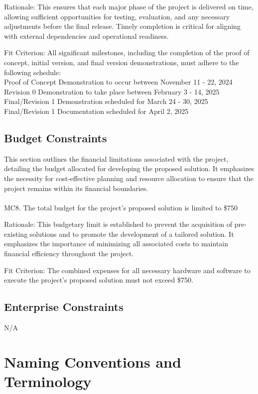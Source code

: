 \documentclass[12pt]{article}
\begin{document}
Rationale: This ensures that each major phase of the project is delivered on time, allowing 
sufficient opportunities for testing, evaluation, and any necessary adjustments before the final 
release. Timely completion is critical for aligning with external dependencies and operational 
readiness.

Fit Criterion: All significant milestones, including the completion of the proof of concept, 
initial version, and final version demonstrations, must adhere to the following schedule:\\
Proof of Concept Demonstration to occur between November 11 - 22, 2024\\
Revision 0 Demonstration to take place between February 3 - 14, 2025\\
Final/Revision 1 Demonstration scheduled for March 24 - 30, 2025\\
Final/Revision 1 Documentation scheduled for April 2, 2025\\


\subsection{Budget Constraints}
This section outlines the financial limitations associated with the project, detailing the budget 
allocated for developing the proposed solution. It emphasizes the necessity for cost-effective 
planning and resource allocation to ensure that the project remains within its financial 
boundaries.
\\\\
\noindent
MC8. The total budget for the project’s proposed solution is limited to \$750

Rationale: This budgetary limit is established to prevent the acquisition of pre-existing 
solutions and to promote the development of a tailored solution. It emphasizes the importance of 
minimizing all associated costs to maintain financial efficiency throughout the project.

Fit Criterion: The combined expenses for all necessary hardware and software to execute the 
project’s proposed solution must not exceed \$750.

\subsection{Enterprise Constraints}
N/A

\section{Naming Conventions and Terminology}
\end{document}
